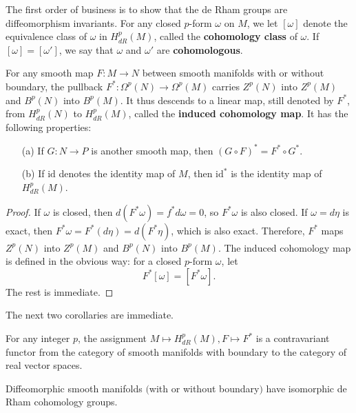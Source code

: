 The first order of business is to show that the de Rham groups are diffeomorphism invariants. For any closed $p$-form $\omega$ on $M$, we let $[\omega]$ denote the equivalence class of $\omega$ in $H^p_{dR}(M)$, called the \textbf{cohomology class} of $\omega$. If $[\omega]=[\omega']$, we say that $\omega$ and $\omega'$ are \textbf{cohomologous}.
\begin{proposition}\label{cohomology induced map}
For any smooth map $F:M\to N$ between smooth manifolds with or without boundary, the pullback $F^*:\Omega^p(N)\to\Omega^p(M)$ carries $Z^p(N)$ into $Z^p(M)$ and $B^p(N)$ into $B^p(M)$. It thus descends to a linear map, still denoted by $F^*$, from $H^p_{dR}(N)$ to $H^p_{dR}(M)$, called the \textbf{induced cohomology map}. It has the following properties:
\begin{itemize}
\item[(a)] If $G:N\to P$ is another smooth map, then $(G\circ F)^*=F^*\circ G^*$.
\item[(b)] If $\mathrm{id}$ denotes the identity map of $M$, then $\mathrm{id}^*$ is the identity map of $H^p_{dR}(M)$.
\end{itemize}
\end{proposition}
\begin{proof}
If $\omega$ is closed, then $d(F^*\omega)=f^*d\omega=0$, so $F^*\omega$ is also closed. If $\omega=d\eta$ is exact, then $F^*\omega=F^*(d\eta)=d(F^*\eta)$, which is also exact. Therefore, $F^*$ maps $Z^p(N)$ into $Z^p(M)$ and $B^p(N)$ into $B^p(M)$. The induced cohomology map is defined in the obvious way: for a closed $p$-form $\omega$, let
\[F^*[\omega]=[F^*\omega].\]
The rest is immediate.
\end{proof}
The next two corollaries are immediate.
\begin{corollary}
For any integer $p$, the assignment $M\mapsto H^p_{dR}(M),F\mapsto F^*$ is a contravariant functor from the category of smooth manifolds with boundary to the category of real vector spaces.
\end{corollary}
\begin{corollary}
Diffeomorphic smooth manifolds $($with or without boundary$)$ have isomorphic de Rham cohomology groups.
\end{corollary}
